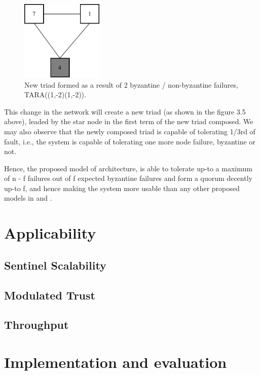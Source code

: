 \documentclass[]{article}
\begin{document}
\begin{figure}[h]
	\centering
	\includegraphics[width=0.35\textwidth]{Triad.png}
	\caption{New triad formed as a result of 2 byzantine / non-byzantine failures, TARA((1,-2)(1,-2)).}
	\label{fig:triad}
\end{figure}

This change in the network will create a new triad (as shown in the figure 3.5 above), leaded by the star node in the first term of the new triad composed. We may also observe that the newly composed triad is capable of tolerating 1/3rd of fault, i.e., the system is capable of tolerating one more node failure, byzantine or not.

Hence, the proposed model of architecture, is able to tolerate up-to a maximum of n - f failures out of f expected byzantine failures and form a quorum decently up-to f, and hence making the system more usable than any other proposed models in \cite{ARTICLE:1} and \cite{ARTICLE:3}.


\section{Applicability}

\subsection{Sentinel Scalability}

\subsection{Modulated Trust}

\subsection{Throughput}

\section{Implementation and evaluation}
\end{document}
